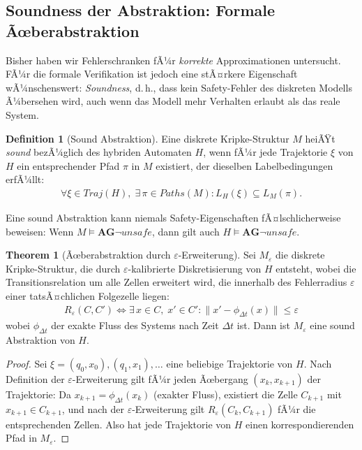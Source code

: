 ﻿\documentclass[a4paper,12pt]{article}
\theoremstyle{definition}
\newtheorem{definition}{Definition}[section]
\newtheorem{theorem}{Theorem}[section]
\begin{document}
\subsection{Soundness der Abstraktion: Formale Ãœberabstraktion}

Bisher haben wir Fehlerschranken fÃ¼r \emph{korrekte} Approximationen untersucht. FÃ¼r die formale Verifikation ist jedoch eine stÃ¤rkere Eigenschaft wÃ¼nschenswert: \emph{Soundness}, d.\,h., dass kein Safety-Fehler des diskreten Modells Ã¼bersehen wird, auch wenn das Modell mehr Verhalten erlaubt als das reale System.

\begin{definition}[Sound Abstraktion]
Eine diskrete Kripke-Struktur $M$ heiÃŸt \emph{sound} bezÃ¼glich des hybriden Automaten $H$, wenn fÃ¼r jede Trajektorie $\xi$ von $H$ ein entsprechender Pfad $\pi$ in $M$ existiert, der dieselben Labelbedingungen erfÃ¼llt:
\begin{align}
  \forall \xi \in \mathit{Traj}(H),\; \exists\, \pi \in \mathit{Paths}(M)\colon L_H(\xi) \subseteq L_M(\pi).
\end{align}
\end{definition}

Eine sound Abstraktion kann niemals Safety-Eigenschaften fÃ¤lschlicherweise beweisen: Wenn $M \models \mathbf{AG}\neg\mathit{unsafe}$, dann gilt auch $H \models \mathbf{AG}\neg\mathit{unsafe}$.

\begin{theorem}[Ãœberabstraktion durch $\varepsilon$-Erweiterung]
\label{thm:soundness}
Sei $M_\varepsilon$ die diskrete Kripke-Struktur, die durch $\varepsilon$-kalibrierte Diskretisierung von $H$ entsteht, wobei die Transitionsrelation um alle Zellen erweitert wird, die innerhalb des Fehlerradius $\varepsilon$ einer tatsÃ¤chlichen Folgezelle liegen:
\begin{align}
  R_\varepsilon(C, C') \iff \exists\, x \in C,\; x' \in C'\colon \|x' - \phi_{\Delta t}(x)\| \leq \varepsilon
\end{align}
wobei $\phi_{\Delta t}$ der exakte Fluss des Systems nach Zeit $\Delta t$ ist. Dann ist $M_\varepsilon$ eine sound Abstraktion von $H$.
\end{theorem}

\begin{proof}
Sei $\xi = (q_0, x_0), (q_1, x_1), \ldots$ eine beliebige Trajektorie von $H$. Nach Definition der $\varepsilon$-Erweiterung gilt fÃ¼r jeden Ãœbergang $(x_k, x_{k+1})$ der Trajektorie: Da $x_{k+1} = \phi_{\Delta t}(x_k)$ (exakter Fluss), existiert die Zelle $C_{k+1}$ mit $x_{k+1} \in C_{k+1}$, und nach der $\varepsilon$-Erweiterung gilt $R_\varepsilon(C_k, C_{k+1})$ fÃ¼r die entsprechenden Zellen. Also hat jede Trajektorie von $H$ einen korrespondierenden Pfad in $M_\varepsilon$.
\end{proof}
\end{document}
